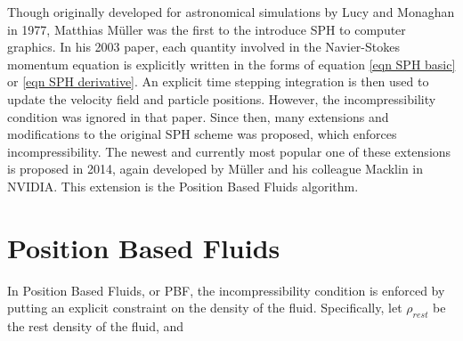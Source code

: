 Though originally developed for astronomical simulations by Lucy\cite{lucy1977numerical} and Monaghan \cite{monaghan1992smoothed} in 1977, Matthias Müller was the first to the introduce SPH to computer graphics\cite{muller2003particle}. In his 2003 paper, each quantity involved in the Navier-Stokes momentum equation is explicitly written in the forms of equation \ref{eqn SPH basic} or \ref{eqn SPH derivative}. An explicit time stepping integration is then used to update the velocity field and particle positions. However, the incompressibility condition was ignored in that paper. Since then, many extensions and modifications to the original SPH scheme was proposed, which enforces incompressibility. The newest and currently most popular one of these extensions is proposed in 2014, again developed by Müller and his colleague Macklin in NVIDIA\cite{macklin2013position}. This extension is the Position Based Fluids algorithm.


\section{Position Based Fluids}
In Position Based Fluids, or PBF, the incompressibility condition is enforced by putting an explicit constraint on the density of the fluid. Specifically, let $\rho_{rest}$ be the rest density of the fluid, and 
